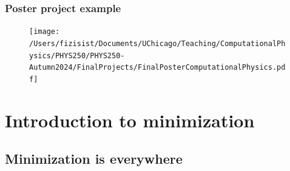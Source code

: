 \documentclass[hyperref={colorlinks=true}]{beamer}
\begin{document}

\begin{frame}%
  \frametitle{Poster project example}
  
  \begin{figure}
    \texttt{[image: /Users/fizisist/Documents/UChicago/Teaching/ComputationalPhysics/PHYS250/PHYS250-Autumn2024/FinalProjects/FinalPosterComputationalPhysics.pdf]}
  \end{figure}
  
\end{frame}

\section[Introduction to minimization]{Introduction to minimization}

\subsection[Minimization is everywhere]{Minimization is everywhere}
\end{document}
